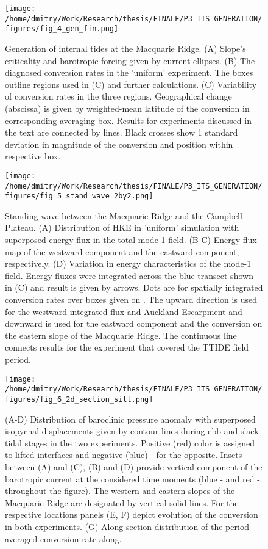 \documentclass[12pt]{article}
\newcommand{\SCALEO}{2}
\newcommand{\SCALET}{1.25}
\begin{document}
\begin{figure}
	\centering
	\texttt{[image: /home/dmitry/Work/Research/thesis/FINALE/P3\_ITS\_GENERATION/figures/fig\_4\_gen\_fin.png]}
	\caption{Generation of internal tides at the Macquarie Ridge. (A) Slope's criticality and 
	barotropic forcing given by current ellipses. (B) The diagnosed conversion rates in the 
	'uniform' experiment. The boxes outline regions used in (C) and further calculations. (C) 
	Variability of conversion rates in the three regions. Geographical change (abscissa) is given 
	by weighted-mean latitude of the conversion in corresponding averaging box. Results for 
	experiments discussed in the text are connected by lines. Black crosses show 1 standard 
	deviation in magnitude of the conversion and position within respective box.}
	\label{C3.fig:gen}
\end{figure}

\begin{figure}
	\centering
	\texttt{[image: /home/dmitry/Work/Research/thesis/FINALE/P3\_ITS\_GENERATION/figures/fig\_5\_stand\_wave\_2by2.png]}
	\caption{Standing wave between the Macquarie Ridge and the Campbell Plateau. (A) Distribution 
	of HKE in 'uniform' simulation with superposed energy flux in the total mode-1 field. (B-C) 
	Energy flux map of the westward component and the eastward component, respectively. (D) 
	Variation in energy characteristics of the mode-1 field. Energy fluxes were integrated across 
	the blue transect shown in (C) and result is given by arrows. Dots are for spatially integrated 
	conversion 
	rates 
	over boxes given on . The upward direction is used for the westward 
	integrated flux and Auckland Escarpment and downward is used for the eastward component and the 
	conversion on the eastern slope of the Macquarie Ridge. The continuous line connects results 
	for the experiment that covered the TTIDE field period.}
	\label{C3.fig:stand_wave}
\end{figure}

\begin{figure}
	\centering
	\texttt{[image: /home/dmitry/Work/Research/thesis/FINALE/P3\_ITS\_GENERATION/figures/fig\_6\_2d\_section\_sill.png]}
	\caption{(A-D) Distribution of baroclinic pressure anomaly with superposed isopycnal 
	displacements given by contour lines during ebb and slack tidal stages in the two experiments. 
	Positive (red) color is assigned to lifted interfaces and negative (blue) - for the opposite. 
	Insets between (A) and (C), (B) and (D) provide vertical component of the barotropic current 
	at the considered time moments (blue -  and red -  throughout the 
	figure). The western and eastern slopes of the Macquarie Ridge are 
	designated by vertical solid lines. For the respective locations panels (E, F) depict evolution 
	of the conversion in both experiments. (G) Along-section distribution of the period-averaged 
	conversion rate along.}
	\label{C3.fig:gen_2d}
\end{figure}
\end{document}
